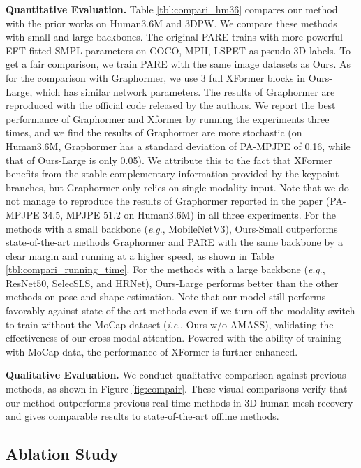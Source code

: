 \documentclass{article}
\newcommand{\ie}{\textit{i}.\textit{e}.}
\newcommand{\eg}{\textit{e}.\textit{g}.}
\newcommand\mypara[1]{\noindent\textbf{#1}}
\begin{document}
\mypara{Quantitative Evaluation.}
Table \ref{tbl:compari_hm36} compares our method with the prior works on Human3.6M and 3DPW. We compare these methods with small and large backbones. 
The original PARE trains with more powerful EFT-fitted \cite{joo2020exemplar} SMPL parameters on COCO, MPII, LSPET \cite{johnson_lspet_cvpr11} as pseudo 3D labels. To get a fair comparison, we train PARE with the same image datasets as Ours. 
As for the comparison with Graphormer, we use 3 full XFormer blocks in Ours-Large, which has similar network parameters. 
The results of Graphormer are reproduced with the official code released by the authors. 
We report the best performance of Graphormer and Xformer by running the experiments three times, and we find the results of Graphormer are more stochastic (on Human3.6M, Graphormer has a standard deviation of PA-MPJPE of 0.16, while that of Ours-Large is only 0.05). We attribute this to the fact that XFormer benefits from the stable complementary information provided by the keypoint branches, but Graphormer only relies on single modality input.
Note that we do not manage to reproduce the results of Graphormer reported in the paper (PA-MPJPE 34.5, MPJPE 51.2 on Human3.6M) in all three experiments.
For the methods with a small backbone (\eg, MobileNetV3), Ours-Small outperforms state-of-the-art methods Graphormer and PARE with the same backbone by a clear margin and running at a higher speed, as shown in Table \ref{tbl:compari_running_time}. 
For the methods with a large backbone (\eg, ResNet50, SelecSLS, and HRNet), Ours-Large performs better than the other methods on pose and shape estimation. 
Note that our model still performs favorably against state-of-the-art methods even if we turn off the modality switch to train without the MoCap dataset (\ie, Ours w/o AMASS), validating the effectiveness of our cross-modal attention. Powered with the ability of training with MoCap data, the performance of XFormer is further enhanced.


\mypara{Qualitative Evaluation.}
We conduct qualitative comparison against previous methods, as shown in Figure \ref{fig:compair}. These visual comparisons verify that our method outperforms previous real-time methods in 3D human mesh recovery and gives comparable results to state-of-the-art offline methods. 

\subsection{Ablation Study}
\label{sec:ablation}
\end{document}
